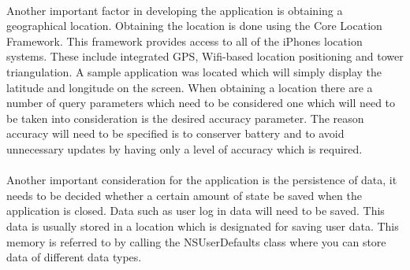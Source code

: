 \documentclass[12pt]{article}
\begin{document}
\paragraph{}
\label{par:First Paragraph}

Another important factor in developing the application is obtaining a geographical location. Obtaining the location is done using the Core Location Framework. This framework provides access to all of the iPhones location systems. These include integrated GPS, Wifi-based location positioning and tower triangulation. 
A sample application was located which will simply display the latitude and longitude on the screen. When obtaining a location there are a number of query parameters which need to be considered  one which will need to be taken into consideration is the desired accuracy parameter. The reason accuracy will need to be specified is to conserver battery and to avoid unnecessary updates by having only a level of accuracy which is required.

\paragraph{}
\label{par:First Paragraph}

Another important consideration for the application is the persistence of data, it needs to be decided whether a certain amount of state be saved when the application is closed. Data such as user log in data will need to be saved. This data is usually stored in a location which is designated for saving user data. This memory is referred to by calling the NSUserDefaults class where you can store data of different data types.



\end{document}
